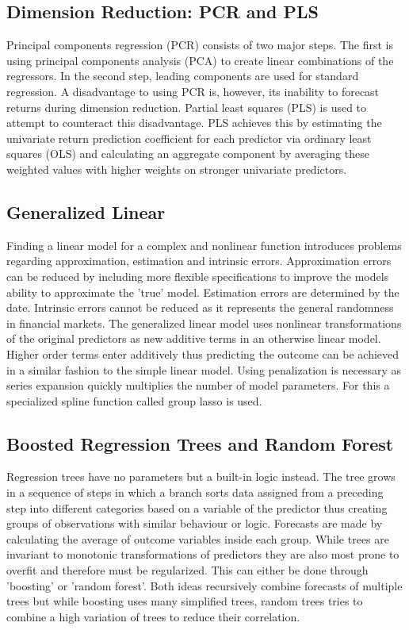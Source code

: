 \subsection{Dimension Reduction: PCR and PLS}
	Principal components regression (PCR) consists of two major steps. The first is using principal components analysis (PCA) to create linear combinations of the regressors. In the second step, leading components are used for standard regression.
	A disadvantage to using PCR is, however, its inability to forecast returns during dimension reduction.
	\newline
	Partial least squares (PLS) is used to attempt to counteract this disadvantage. PLS achieves this by estimating the univariate return prediction coefficient for each predictor via ordinary least squares (OLS)
	and calculating an aggregate component by averaging these weighted values
	with higher weights on stronger univariate predictors.

\subsection{Generalized Linear}
	Finding a linear model for a complex and nonlinear function introduces problems regarding approximation, estimation and intrinsic errors.
	Approximation errors can be reduced by including more flexible specifications to improve the
	models ability to approximate the 'true' model.
	Estimation errors are determined by the date.
	Intrinsic errors cannot be reduced as it represents the general randomness in financial markets.
	The generalized linear model uses nonlinear transformations of the original predictors as new
	additive terms in an otherwise linear model.
	Higher order terms enter additively thus predicting the outcome can be achieved in a similar fashion to the simple linear model.
	Using penalization is necessary as series expansion quickly multiplies the number of model parameters.
	For this a specialized spline function called group lasso is used.

\subsection{Boosted Regression Trees and Random Forest}
	Regression trees have no parameters but a built-in logic instead.
	The tree grows in a sequence of steps in which a branch sorts data assigned from a preceding step into different categories based on a variable of the predictor thus creating groups of observations with similar behaviour or logic.
	Forecasts are made by calculating the average of outcome variables inside each group.
	While trees are invariant to monotonic transformations of predictors they are
	also most prone to overfit and therefore must be regularized. This can either be done through 'boosting' or 'random forest'. Both ideas recursively combine
	forecasts of multiple trees but while boosting uses many simplified trees, random trees tries to combine a high variation of trees to reduce their correlation.

